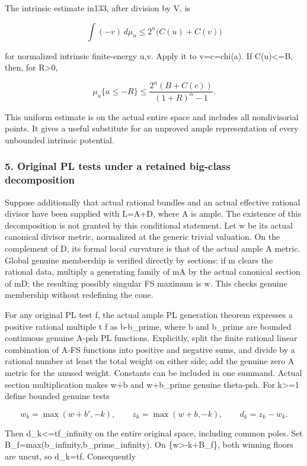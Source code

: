 \documentclass[
]{article}
\begin{document}
The intrinsic estimate in133, after division by V, is

\[\int(-v)\,d\mu_u\leq2^n\bigl(C(u)+C(v)\bigr)\]

for normalized intrinsic finite-energy u,v. Apply it to v=c=chi(a). If
C(u)\textless=B, then, for R\textgreater0,

\[\mu_u\{a\leq-R\}\leq
\frac{2^n(B+C(c))}{(1+R)^\alpha-1}.\tag{3}\]

This uniform estimate is on the actual entire space and includes all
nondivisorial points. It gives a useful substitute for an unproved ample
representation of every unbounded intrinsic potential.

\subsubsection{5. Original PL tests under a retained big-class
decomposition}\label{original-pl-tests-under-a-retained-big-class-decomposition}

Suppose additionally that actual rational bundles and an actual
effective rational divisor have been supplied with L=A+D, where A is
ample. The existence of this decomposition is not granted by this
conditional statement. Let w be its actual canonical divisor metric,
normalized at the generic trivial valuation. On the complement of D, its
formal local curvature is that of the actual ample A metric. Global
genuine membership is verified directly by sections: if m clears the
rational data, multiply a generating family of mA by the actual
canonical section of mD; the resulting possibly singular FS maximum is
w. This checks genuine membership without redefining the cone.

For any original PL test f, the actual ample PL generation theorem
expresses a positive rational multiple t f as b-b\_prime, where b and
b\_prime are bounded continuous genuine A-psh PL functions. Explicitly,
split the finite rational linear combination of A-FS functions into
positive and negative sums, and divide by a rational number at least the
total weight on either side; add the genuine zero A metric for the
unused weight. Constants can be included in one summand. Actual section
multiplication makes w+b and w+b\_prime genuine theta-psh. For
k\textgreater=1 define bounded genuine tests

\[w_k=\max(w+b',-k),\qquad z_k=\max(w+b,-k),\qquad d_k=z_k-w_k.\]

Then
\textbar d\_k\textbar\textless=t\textbar\textbar f\textbar\textbar\_infinity
on the entire original space, including common poles. Set
B\_f=max(\textbar\textbar b\textbar\textbar\_infinity,\textbar\textbar b\_prime\textbar\textbar\_infinity).
On \{w\textgreater-k+B\_f\}, both winning floors are uncut, so d\_k=tf.
Consequently
\end{document}
